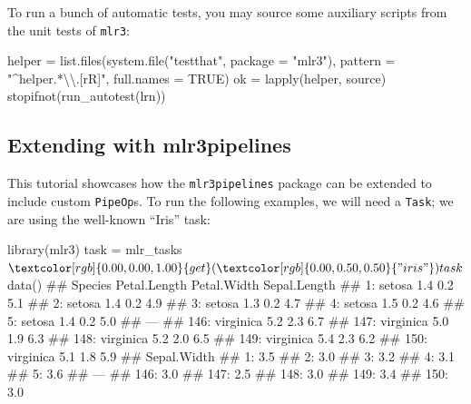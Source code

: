 \documentclass[]{article}
\newenvironment{Shaded}{}{}
\newcommand{\CharTok}[1]{\textcolor[rgb]{0.00,0.50,0.50}{#1}}
\newcommand{\DataTypeTok}[1]{#1}
\newcommand{\KeywordTok}[1]{\textcolor[rgb]{0.00,0.00,1.00}{#1}}
\newcommand{\NormalTok}[1]{#1}
\newcommand{\OperatorTok}[1]{#1}
\newcommand{\OtherTok}[1]{\textcolor[rgb]{1.00,0.25,0.00}{#1}}
\newcommand{\StringTok}[1]{\textcolor[rgb]{0.00,0.50,0.50}{#1}}
\renewenvironment{Shaded} {\begin{snugshade}\small} {\end{snugshade}}
\begin{document}
To run a bunch of automatic tests, you may source some auxiliary scripts from the unit tests of \texttt{mlr3}:

\begin{Shaded}
\begin{Highlighting}[]
\NormalTok{helper =}\StringTok{ }\KeywordTok{list.files}\NormalTok{(}\KeywordTok{system.file}\NormalTok{(}\StringTok{"testthat"}\NormalTok{, }\DataTypeTok{package =} \StringTok{"mlr3"}\NormalTok{), }\DataTypeTok{pattern =} \StringTok{"^helper.*}\CharTok{\textbackslash{}\textbackslash{}}\StringTok{.[rR]"}\NormalTok{, }\DataTypeTok{full.names =} \OtherTok{TRUE}\NormalTok{)}
\NormalTok{ok =}\StringTok{ }\KeywordTok{lapply}\NormalTok{(helper, source)}
\KeywordTok{stopifnot}\NormalTok{(}\KeywordTok{run_autotest}\NormalTok{(lrn))}
\end{Highlighting}
\end{Shaded}

\hypertarget{extending-mlr3pipelines}{%
\subsection{Extending with mlr3pipelines}\label{extending-mlr3pipelines}}

This tutorial showcases how the \texttt{mlr3pipelines} package can be extended to include custom \texttt{PipeOp}s.
To run the following examples, we will need a \texttt{Task}; we are using the well-known ``Iris'' task:

\begin{Shaded}
\begin{Highlighting}[]
\KeywordTok{library}\NormalTok{(mlr3)}
\NormalTok{task =}\StringTok{ }\NormalTok{mlr_tasks}\OperatorTok{$}\KeywordTok{get}\NormalTok{(}\StringTok{"iris"}\NormalTok{)}
\NormalTok{task}\OperatorTok{$}\KeywordTok{data}\NormalTok{()}
\NormalTok{##        Species Petal.Length Petal.Width Sepal.Length}
\NormalTok{##   1:    setosa          1.4         0.2          5.1}
\NormalTok{##   2:    setosa          1.4         0.2          4.9}
\NormalTok{##   3:    setosa          1.3         0.2          4.7}
\NormalTok{##   4:    setosa          1.5         0.2          4.6}
\NormalTok{##   5:    setosa          1.4         0.2          5.0}
\NormalTok{##  ---                                                }
\NormalTok{## 146: virginica          5.2         2.3          6.7}
\NormalTok{## 147: virginica          5.0         1.9          6.3}
\NormalTok{## 148: virginica          5.2         2.0          6.5}
\NormalTok{## 149: virginica          5.4         2.3          6.2}
\NormalTok{## 150: virginica          5.1         1.8          5.9}
\NormalTok{##      Sepal.Width}
\NormalTok{##   1:         3.5}
\NormalTok{##   2:         3.0}
\NormalTok{##   3:         3.2}
\NormalTok{##   4:         3.1}
\NormalTok{##   5:         3.6}
\NormalTok{##  ---            }
\NormalTok{## 146:         3.0}
\NormalTok{## 147:         2.5}
\NormalTok{## 148:         3.0}
\NormalTok{## 149:         3.4}
\NormalTok{## 150:         3.0}
\end{Highlighting}
\end{Shaded}
\end{document}
